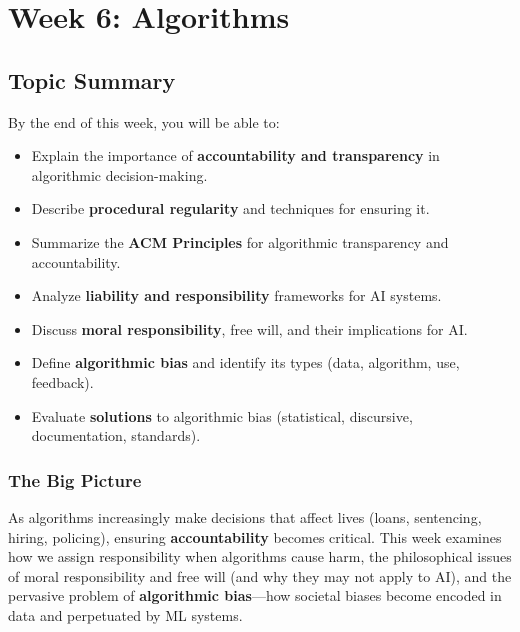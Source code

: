 \section{Week 6: Algorithms}

\subsection{Topic Summary}

\begin{keybox}
By the end of this week, you will be able to:
\begin{itemize}
  \item Explain the importance of \textbf{accountability and transparency} in algorithmic decision-making.
  \item Describe \textbf{procedural regularity} and techniques for ensuring it.
  \item Summarize the \textbf{ACM Principles} for algorithmic transparency and accountability.
  \item Analyze \textbf{liability and responsibility} frameworks for AI systems.
  \item Discuss \textbf{moral responsibility}, free will, and their implications for AI.
  \item Define \textbf{algorithmic bias} and identify its types (data, algorithm, use, feedback).
  \item Evaluate \textbf{solutions} to algorithmic bias (statistical, discursive, documentation, standards).
\end{itemize}
\end{keybox}

\separator

\subsubsection*{The Big Picture}

As algorithms increasingly make decisions that affect lives (loans, sentencing, hiring, policing), ensuring \textbf{accountability} becomes critical. This week examines how we assign responsibility when algorithms cause harm, the philosophical issues of moral responsibility and free will (and why they may not apply to AI), and the pervasive problem of \textbf{algorithmic bias}---how societal biases become encoded in data and perpetuated by ML systems.

